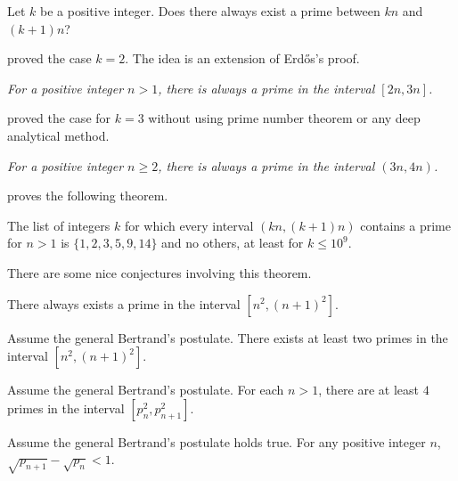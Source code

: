 \documentclass{subfile}
\begin{document}
	\begin{problem}
		Let $k$ be a positive integer. Does there always exist a prime between $kn$ and $(k+1)n$?
	\end{problem}
\textcite{bachraoui_2006} proved the case $k=2$. The idea is an extension of Erd\H{o}s's proof.
	\begin{theorem}[Bachraoui]\slshape
		For a positive integer $n>1$, there is always a prime in the interval $[2n,3n]$.
	\end{theorem}
\textcite{loo_2011} proved the case for $k=3$ without using prime number theorem or any deep analytical method.
	\begin{theorem}[Loo]\slshape
		For a positive integer $n\geq2$, there is always a prime in the interval $(3n,4n)$.
	\end{theorem}
\textcite{moses_shevelev_greathouse_2013} proves the following theorem.
	\begin{theorem}
		The list of integers $k$ for which every interval $(kn,(k+1)n)$ contains a prime for $n>1$ is $\{1,2,3,5,9,14\}$ and no others, at least for $k\leq10^9$.
	\end{theorem}
There are some nice conjectures involving this theorem.
	\begin{conjecture}
		There always exists a prime in the interval $[n^2,(n+1)^2]$.
	\end{conjecture}

	\begin{theorem}
		Assume the general Bertrand's postulate. There exists at least two primes in the interval $[n^2,(n+1)^2]$.
	\end{theorem}

	\begin{theorem}
		Assume the general Bertrand's postulate. For each $n>1$, there are at least $4$ primes in the interval $[p_n^2,p_{n+1}^2]$.
	\end{theorem}

	\begin{theorem}
		Assume the general Bertrand's postulate holds true. For any positive integer $n$, $\sqrt{p_{n+1}}-\sqrt{p_n}<1$.
	\end{theorem}
\end{document}

